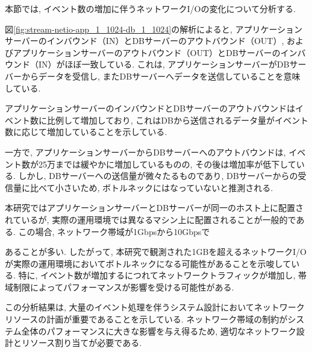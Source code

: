 \documentclass[../../../../../main]{subfiles}
\begin{document}
    \label{subsubsec:result-streaming-only-limit-diskio}

    本節では, イベント数の増加に伴うネットワークI/Oの変化について分析する.

    

    図\ref{fig:stream-netio-app_1_1024-db_1_1024}の解析によると, アプリケーションサーバーのインバウンド（IN）とDBサーバーのアウトバウンド（OUT）, およびアプリケーションサーバーのアウトバウンド（OUT）とDBサーバーのインバウンド（IN）がほぼ一致している. これは, アプリケーションサーバーがDBサーバーからデータを受信し, またDBサーバーへデータを送信していることを意味している.

    アプリケーションサーバーのインバウンドとDBサーバーのアウトバウンドはイベント数に比例して増加しており, これはDBから送信されるデータ量がイベント数に応じて増加していることを示している.

    一方で, アプリケーションサーバーからDBサーバーへのアウトバウンドは, イベント数が25万までは緩やかに増加しているものの, その後は増加率が低下している. しかし, DBサーバーへの送信量が微々たるものであり, DBサーバーからの受信量に比べて小さいため, ボトルネックにはなっていないと推測される.

    本研究ではアプリケーションサーバーとDBサーバーが同一のホスト上に配置されているが, 実際の運用環境では異なるマシン上に配置されることが一般的である. この場合, ネットワーク帯域が1Gbpsから10Gbpsで

    あることが多い. したがって, 本研究で観測された1GBを超えるネットワークI/Oが実際の運用環境においてボトルネックになる可能性があることを示唆している. 特に, イベント数が増加するにつれてネットワークトラフィックが増加し, 帯域制限によってパフォーマンスが影響を受ける可能性がある.

    この分析結果は, 大量のイベント処理を伴うシステム設計においてネットワークリソースの計画が重要であることを示している. ネットワーク帯域の制約がシステム全体のパフォーマンスに大きな影響を与え得るため, 適切なネットワーク設計とリソース割り当てが必要である.
\end{document}
